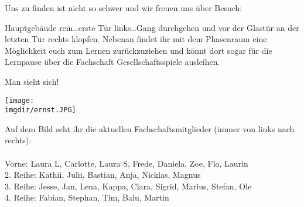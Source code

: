 Uns zu finden ist nicht so schwer und wir freuen uns über Besuch:

Hauptgebäude rein\ldots erste Tür links\ldots Gang durchgehen und vor der Glastür an der letzten Tür rechts klopfen. Nebenan findet ihr mit dem Phasenraum eine Möglichkeit euch zum Lernen zurückzuziehen und könnt dort sogar für die Lernpause über die Fachschaft Gesellschaftsspiele ausleihen.

Man sieht sich!

\newpage
\begin{center}
	\texttt{[image: \\imgdir/ernst.JPG]}
\end{center}
Auf dem Bild seht ihr die aktuellen Fachschaftsmitglieder (immer von links nach rechts):\\ \\
Vorne: Laura L, Carlotte, Laura S, Frede, Daniela, Zoe, Flo, Laurin\\
2. Reihe: Kathii, Julii, Bastian, Anja, Nicklas, Magnus\\
3. Reihe: Jesse, Jan, Lena, Kappa, Clara, Sigrid, Marius, Stefan, Ole\\
4. Reihe: Fabian, Stephan, Tim, Balu, Martin\\